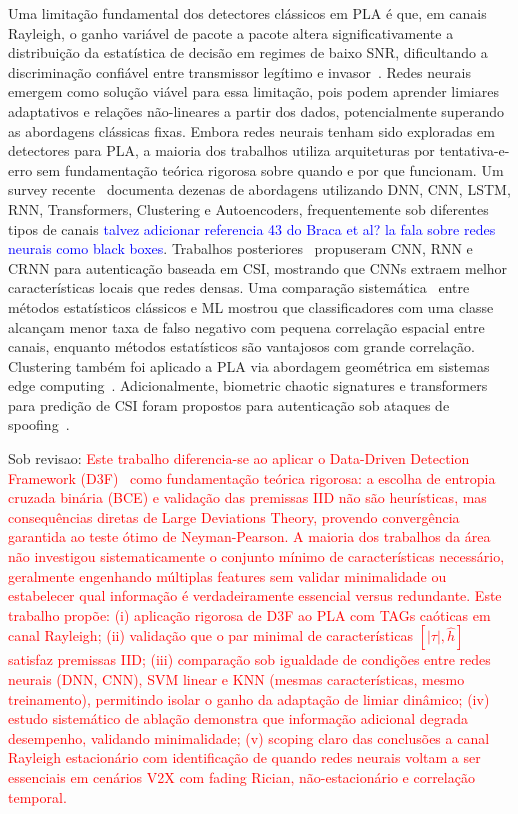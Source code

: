 \documentclass{sbrt}
\newcommand{\bblue}[1]{\textcolor{blue}{#1}}
\newcommand{\rred}[1]{\textcolor{red}{#1}}
\begin{document}
Uma limitação fundamental dos detectores clássicos em PLA é que, em canais Rayleigh, o ganho variável de pacote a pacote altera significativamente a distribuição da estatística de decisão em regimes de baixo SNR, dificultando a discriminação confiável entre transmissor legítimo e invasor~\cite{ref_xie}. Redes neurais emergem como solução viável para essa limitação, pois podem aprender limiares adaptativos e relações não-lineares a partir dos dados, potencialmente superando as abordagens clássicas fixas. Embora redes neurais tenham sido exploradas em detectores para PLA, a maioria dos trabalhos utiliza arquiteturas por tentativa-e-erro sem fundamentação teórica rigorosa sobre quando e por que funcionam. Um survey recente~\cite{ref_survey_ml_pla} documenta dezenas de abordagens utilizando DNN, CNN, LSTM, RNN, Transformers, Clustering e Autoencoders, frequentemente sob diferentes tipos de canais \bblue{ talvez adicionar referencia 43 do Braca et al? la fala sobre redes neurais como black boxes}. Trabalhos posteriores~\cite{ref_wang_dnn_csi} propuseram CNN, RNN e CRNN para autenticação baseada em CSI, mostrando que CNNs extraem melhor características locais que redes densas. Uma comparação sistemática~\cite{ref_comparison_stat_ml} entre métodos estatísticos clássicos e ML mostrou que classificadores com uma classe alcançam menor taxa de falso negativo com pequena correlação espacial entre canais, enquanto métodos estatísticos são vantajosos com grande correlação. Clustering também foi aplicado a PLA via abordagem geométrica em sistemas edge computing~\cite{ref_clustering_pla}. Adicionalmente, biometric chaotic signatures e transformers para predição de CSI foram propostos para autenticação sob ataques de spoofing~\cite{ref_biometric_chaotic, ref_transformer_csi_pred}.

Sob revisao: \rred{Este trabalho diferencia-se ao aplicar o Data-Driven Detection Framework (D3F)~\cite{ref_braca} como fundamentação teórica rigorosa: a escolha de entropia cruzada binária (BCE) e validação das premissas IID não são heurísticas, mas consequências diretas de Large Deviations Theory, provendo convergência garantida ao teste ótimo de Neyman-Pearson. A maioria dos trabalhos da área não investigou sistematicamente o conjunto mínimo de características necessário, geralmente engenhando múltiplas features sem validar minimalidade ou estabelecer qual informação é verdadeiramente essencial versus redundante. Este trabalho propõe: (i) aplicação rigorosa de D3F ao PLA com TAGs caóticas em canal Rayleigh; (ii) validação que o par minimal de características $[|\tau|, \hat{h}]$ satisfaz premissas IID; (iii) comparação sob igualdade de condições entre redes neurais (DNN, CNN), SVM linear e KNN (mesmas características, mesmo treinamento), permitindo isolar o ganho da adaptação de limiar dinâmico; (iv) estudo sistemático de ablação demonstra que informação adicional degrada desempenho, validando minimalidade; (v) scoping claro das conclusões a canal Rayleigh estacionário com identificação de quando redes neurais voltam a ser essenciais em cenários V2X com fading Rician, não-estacionário e correlação temporal.}
\end{document}

